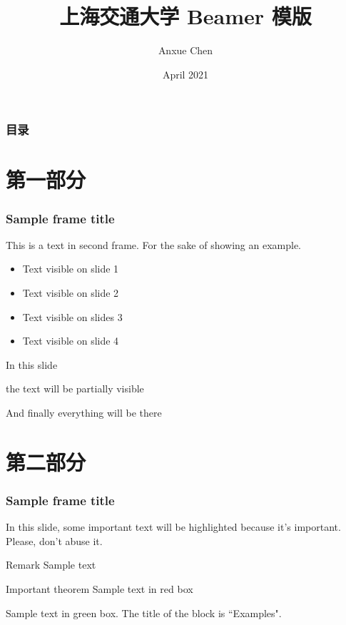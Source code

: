 \documentclass[xcolor=table,dvipsnames,svgnames,aspectratio=169]{ctexbeamer}
\title[SJTU Beamer Template] %
{\textbf{上海交通大学 Beamer 模版}} %
\author[Anxue Chen]
{Anxue Chen}
\institute[SJTU]{Shanghai Jiao Tong University}
\date{April 2021}
\begin{document}
\frame{\titlepage}

\begin{frame}
	\frametitle{目录}
	\tableofcontents
\end{frame}

\section{第一部分}

\begin{frame}
	\frametitle{Sample frame title}
	This is a text in second frame. For the sake of showing an example.

	\begin{itemize}
		\item<1-> Text visible on slide 1
		\item<2-> Text visible on slide 2
		\item<3> Text visible on slides 3
		\item<4-> Text visible on slide 4
	\end{itemize}
\end{frame}

\begin{frame}
	In this slide \pause

	the text will be partially visible \pause

	And finally everything will be there
\end{frame}

\section{第二部分}

\begin{frame}
	\frametitle{Sample frame title}

	In this slide, some important text will be
	\alert{highlighted} because it's important.
	Please, don't abuse it.

	\begin{block}{Remark}
		Sample text
	\end{block}

	\begin{alertblock}{Important theorem}
		Sample text in red box
	\end{alertblock}

	\begin{examples}
		Sample text in green box. The title of the block is ``Examples".
	\end{examples}
\end{frame}
\end{document}
